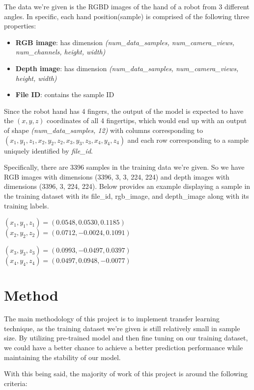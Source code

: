 \documentclass[11pt]{article}
\providecommand{\tightlist}{%
      \setlength{\itemsep}{0pt}\setlength{\parskip}{0pt}}
\begin{document}
The data we're given is the RGBD images of the hand of a robot from 3
different angles. In specific, each hand position(sample) is comprised
of the following three properties:

\begin{itemize}
\tightlist
\item
  \textbf{RGB image}: has dimension \emph{(num\_data\_samples,
  num\_camera\_views, num\_channels, height, width)}
\item
  \textbf{Depth image}: has dimension \emph{(num\_data\_samples,
  num\_camera\_views, height, width)}
\item
  \textbf{File ID}: contains the sample ID
\end{itemize}

Since the robot hand has 4 fingers, the output of the model is expected
to have the \((x, y, z)\) coordinates of all 4 fingertips, which would
end up with an output of shape \emph{(num\_data\_samples, 12)} with
columns corresponding to
\((x_1, y_1, z_1, x_2, y_2, z_2, x_3, y_3, z_3, x_4, y_4, z_4)\) and
each row corresponding to a sample uniquely identified by
\emph{file\_id}.

Specifically, there are 3396 samples in the training data we're given.
So we have RGB images with dimensions (3396, 3, 3, 224, 224) and depth
images with dimensions (3396, 3, 224, 224). Below provides an example
displaying a sample in the training dataset with its file\_id,
rgb\_image, and depth\_image along with its training labels.

\((x_1, y_1, z_1) = (0.0548, 0.0530, 0.1185)\) \(\,\,\,\,\,\,\,\,\,\)
\((x_2, y_2, z_2) = (0.0712, -0.0024, 0.1091)\)

\((x_3, y_3, z_3) = (0.0993, -0.0497, 0.0397)\) \(\,\,\,\,\,\)
\((x_4, y_4, z_4) = (0.0497, 0.0948, -0.0077)\)

    \hypertarget{method}{%
\section{Method}\label{method}}

The main methodology of this project is to implement transfer learning
technique, as the training dataset we're given is still relatively small
in sample size. By utilizing pre-trained model and then fine tuning on
our training dataset, we could have a better chance to achieve a better
prediction performance while maintaining the stability of our model.

With this being said, the majority of work of this project is around the
following criteria:
\end{document}
